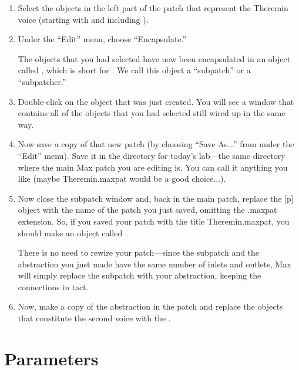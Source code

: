 \begin{enumerate}
\item Select the objects in the left part of the patch that represent
the Theremin voice (starting with  and including ).

\item Under the ``Edit'' menu, choose ``Encapsulate.''


The objects that you had selected have now been encapsulated in an object called , 
which is short for .  We call this object a ``subpatch'' or a ``subpatcher.''


\item Double-click on the  object that was just created.  You will see a window that contains 
all of the objects that you had selected still wired up in the same way.  

\item Now save a copy of that new patch (by choosing ``Save As...'' from under the ``Edit'' menu).
Save it in the directory for today's lab---the same directory where the main Max patch
you are editing is.  You can call it anything you like (maybe Theremin.maxpat would be a good choice...).

\item Now close the subpatch window and, back in the main patch, 
replace the [p] object with the name of the patch you just saved,
omitting  the .maxpat extension.  So, if you saved your patch with the title Theremin.maxpat, 
you should make an object called .  


There is no need to rewire your patch---since the subpatch and the abstraction you 
just made have the same number of inlets and outlets, Max will simply replace
the subpatch with your  abstraction, keeping the connections
in tact.

\item Now, make a copy of the  abstraction in the patch and replace the 
objects that constitute the second voice with the .


\end{enumerate}

\section{Parameters}

